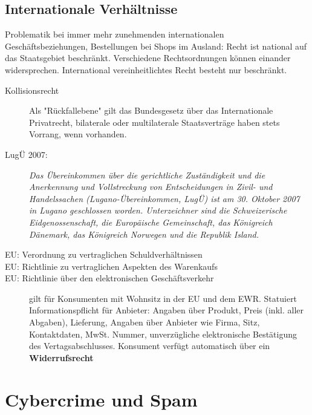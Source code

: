 \subsection{Internationale Verhältnisse}

Problematik bei immer mehr zunehmenden internationalen Geschäftsbeziehungen, Bestellungen bei Shops im Ausland:
Recht ist national auf das Staatsgebiet beschränkt. Verschiedene Rechtsordnungen können einander widersprechen. International vereinheitlichtes Recht besteht nur beschränkt.

\begin{description}
  \item[Kollisionsrecht] Als "Rückfallebene" gilt das Bundesgesetz über das Internationale Privatrecht, bilaterale oder multilaterale Staatsverträge haben stets Vorrang, wenn vorhanden. 
  \item[LugÜ 2007:]
  \textit{
    Das Übereinkommen über die gerichtliche Zuständigkeit und die Anerkennung und Vollstreckung von Entscheidungen in Zivil- und Handelssachen (Lugano-Übereinkommen, LugÜ) ist am 30. Oktober 2007 in Lugano geschlossen worden. Unterzeichner sind die Schweizerische Eidgenossenschaft, die Europäische Gemeinschaft, das Königreich Dänemark, das Königreich Norwegen und die Republik Island.}
    \item[EU: Verordnung zu vertraglichen Schuldverhältnissen]
    \item[EU: Richtlinie zu vertraglichen Aspekten des Warenkaufs]
    \item[EU: Richtlinie über den elektronischen Geschäftsverkehr] gilt für Konsumenten mit Wohnsitz in der EU und dem EWR. Statuiert Informationspflicht für Anbieter: Angaben über Produkt, Preis (inkl. aller Abgaben), Lieferung, Angaben über Anbieter wie Firma, Sitz, Kontaktdaten, MwSt. Nummer, unverzügliche elektronische Bestätigung des Vertagsabschlusses. Konsument verfügt automatisch über ein \textbf{Widerrufsrecht}
    \item[]
  \end{description}
    
\section{Cybercrime und Spam}

